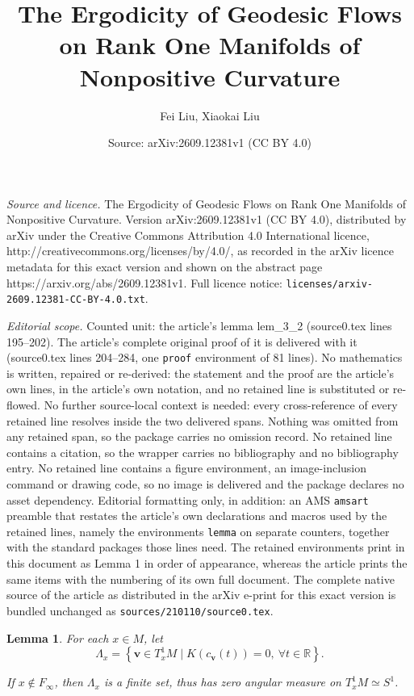 \documentclass[10pt,a4paper]{amsart}
\title{The Ergodicity of Geodesic Flows on Rank One Manifolds of Nonpositive Curvature}
\author{Fei Liu, Xiaokai Liu}
\date{Source: arXiv:2609.12381v1 (CC BY 4.0)}
\newtheorem{lemma}{Lemma}
\begin{document}
\maketitle

\noindent\emph{Source and licence.} The Ergodicity of Geodesic Flows on Rank One Manifolds of Nonpositive Curvature. Version arXiv:2609.12381v1 (CC BY 4.0), distributed by arXiv under the Creative Commons Attribution 4.0 International licence, http://creativecommons.org/licenses/by/4.0/, as recorded in the arXiv licence metadata for this exact version and shown on the abstract page https://arxiv.org/abs/2609.12381v1. Full licence notice: \texttt{licenses/arxiv-2609.12381-CC-BY-4.0.txt}.\par\smallskip

\noindent\textit{Editorial scope.} Counted unit: the article's lemma lem\_3\_2 (source0.tex lines 195--202). The article's complete original proof of it is delivered with it (source0.tex lines 204--284, one \texttt{proof} environment of 81 lines). No mathematics is written, repaired or re-derived: the statement and the proof are the article's own lines, in the article's own notation, and no retained line is substituted or re-flowed.  No further source-local context is needed: every cross-reference of every retained line resolves inside the two delivered spans.  Nothing was omitted from any retained span, so the package carries no omission record.  No retained line contains a citation, so the wrapper carries no bibliography and no bibliography entry.  No retained line contains a figure environment, an image-inclusion command or drawing code, so no image is delivered and the package declares no asset dependency.  Editorial formatting only, in addition: an AMS \texttt{amsart} preamble that restates the article's own declarations and macros used by the retained lines, namely the environments \texttt{lemma} on separate counters, together with the standard packages those lines need.  The retained environments print in this document as Lemma 1 in order of appearance, whereas the article prints the same items with the numbering of its own full document.  The complete native source of the article as distributed in the arXiv e-print for this exact version is bundled unchanged as \texttt{sources/210110/source0.tex}.
\begin{lemma}\label{lem_3_2}
	For each $x\in M$, let
	\begin{displaymath}
		\Lambda_{x} = \left\{\bm{v}\in T^{1}_{x}M \mid K(c_{\bm{v}}(t))=0,~\forall t\in\mathbb{R}\right\}.
	\end{displaymath}

	If $x\notin F_{\infty}$, then $\Lambda_x$ is a finite set, thus has zero angular measure on $T_x^1M\simeq S^1$.
\end{lemma}
\end{document}
